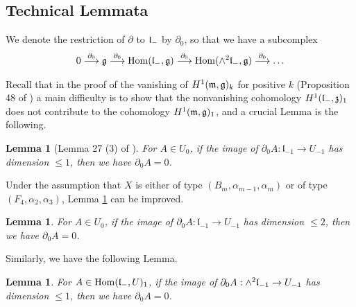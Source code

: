 \documentclass[12pt]{amsart}
\theoremstyle{plain}
\newtheorem{lemma} [theorem]{Lemma}
\theoremstyle{definition}
\def\Hom{\operatorname{Hom}}
\begin{document}
 \subsection{Technical Lemmata} \label{sect:technical lemma}
%
We denote the restriction of $\partial$ to $\frak l_-$ by $\partial_0$, so that we have a subcomplex
 \begin{eqnarray*}
 0 \stackrel{\partial_0}{\longrightarrow} \frak g \stackrel{\partial_0}{\longrightarrow} \Hom( \frak l_-, \frak g ) \stackrel{\partial_0}{\longrightarrow} \Hom(\wedge^2 \frak l_-  ,\frak g   ) \stackrel{\partial_0}{\longrightarrow} \dots
 \end{eqnarray*}

 Recall that in the proof of the vanishing of $H^1(\frak m, \frak g)_k$ for positive $k$ (Proposition 48 of \cite{Ki}) a main difficulty is to show that  the nonvanishing  cohomology $H^1(\frak l_-, \mathfrak z)_1$ does not contribute to the cohomology $H^1(\frak m, \frak g)_1$, and a crucial Lemma is   the following.

\begin{lemma} [Lemma 27 (3) of \cite{Ki}] \label{lem: cohomology lemma 1 old version} For  $A \in U_0$, if the image of $\partial_0 A: \mathfrak l_{-1} \rightarrow U_{-1}$ has dimension $\leq 1$, then we have $\partial_0A=0$.
\end{lemma}

Under the assumption that $X$ is either of type $(B_m, \alpha_{m-1}, \alpha_m)$   or of type $(F_4, \alpha_2, \alpha_3)$, Lemma \ref{lem: cohomology lemma 1 old version}  can be improved.

\begin{lemma}   \label{lem: cohomology lemma 1} For  $A \in U_0$, if the image of $\partial_0 A: \mathfrak l_{-1} \rightarrow U_{-1}$ has dimension $\leq     2$, then we have $\partial_0A=0$.
\end{lemma}
%
Similarly, we have the following Lemma.

\begin{lemma} \label{lem: cohomology lemma 2} 
For $A \in \Hom(\frak l_-, U)_1$, if the image of $\partial_0A: \wedge^2 \frak l_{-1} \rightarrow U_{-1}$ has dimension $\leq 1$, then we have $\partial_0 A=0$.


\end{lemma}
\end{document}
